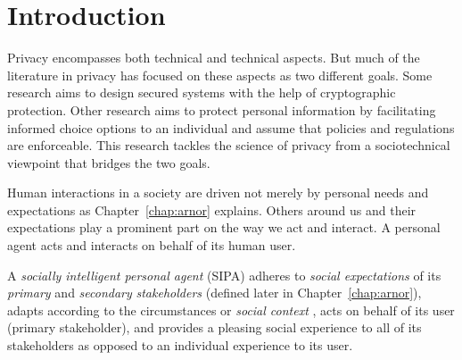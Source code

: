 \chapter{Introduction}
\label{chap:intro}

\begin{tcolorbox}[width=\columnwidth,
    tikznode boxed title,
    enhanced,
    interior style={white},
    boxsep=3pt,left=3pt,right=3pt,bottom=2pt,
    width=\columnwidth,
    boxrule=1pt,
    attach boxed title to top center= {yshift=-\tcboxedtitleheight/2},
    colbacktitle=white,coltitle=black,
    boxed title style={size=normal,colframe=white,boxrule=0pt},
    title={My Thesis},
    ]%
\end{tcolorbox}


Privacy encompasses both technical and technical aspects. But much of the
literature in privacy has focused on these aspects as two
different goals.  Some research aims to design secured systems with the help of
cryptographic protection. Other research aims to protect personal information
by facilitating informed choice options to an individual and assume that
policies and regulations are enforceable. This research tackles
the science of privacy from a sociotechnical viewpoint that bridges the 
two goals.

Human interactions in a society are driven not merely by personal needs
and expectations as Chapter~\ref{chap:arnor} explains. 
Others around us and their expectations play a
prominent part on the way we act and interact. A personal agent acts and
interacts on behalf of its human user. 

A \emph{socially intelligent personal agent} (SIPA) adheres to
\emph{social expectations} of its \emph{primary} and \emph{secondary} 
\emph{stakeholders} (defined later in
Chapter~\ref{chap:arnor}), adapts according to the circumstances or
\emph{social context} \citep{Dey-2001-Context}, acts on behalf of its
user (primary stakeholder), and provides a pleasing social
experience to all of its stakeholders as opposed to an individual
experience to its user.

